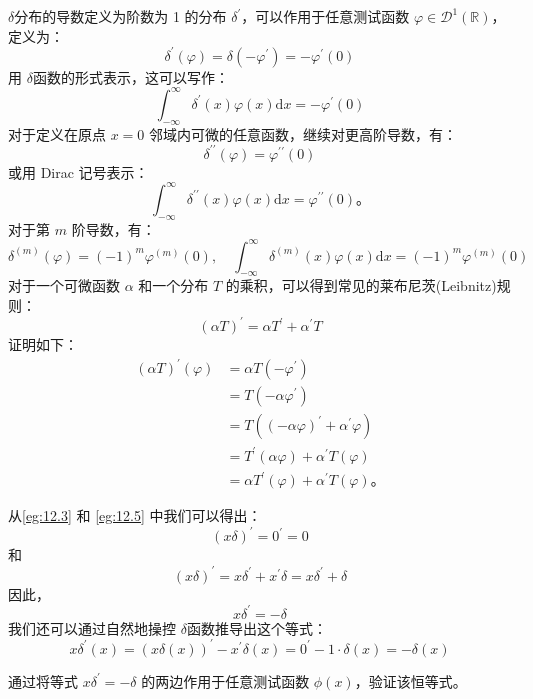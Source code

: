 \begin{eg}\label{eg:12.5} 
  $\delta$分布的导数定义为阶数为 1 的分布
$\delta^{\prime}$，可以作用于任意测试函数
$\varphi \in \mathcal{D}^1(\mathbb{R})$，定义为：
 $$
\delta^{\prime}(\varphi) = \delta\left(-\varphi^{\prime}\right) = -\varphi^{\prime}(0)
$$
用 $\delta$函数的形式表示，这可以写作：
 $$
\int_{-\infty}^\infty \delta^{\prime}(x) \varphi(x) \mathrm{d}x = -\varphi^{\prime}(0)
$$
对于定义在原点 $x=0$ 邻域内可微的任意函数，继续对更高阶导数，有：
 $$
\delta^{\prime\prime}(\varphi) = \varphi^{\prime\prime}(0)
$$
或用 Dirac 记号表示：
 $$
\int_{-\infty}^\infty \delta^{\prime\prime}(x) \varphi(x) \mathrm{d}x = \varphi^{\prime\prime}(0)。
$$
对于第 $m$ 阶导数，有：
 $$
\delta^{(m)}(\varphi) = (-1)^m \varphi^{(m)}(0), \quad \int_{-\infty}^\infty \delta^{(m)}(x) \varphi(x) \mathrm{d}x = (-1)^m \varphi^{(m)}(0)
$$
对于一个可微函数 $\alpha$ 和一个分布 $T$ 的乘积，可以得到常见的莱布尼茨(Leibnitz)规则：
 $$
(\alpha T)^{\prime} = \alpha T^{\prime} + \alpha^{\prime} T
$$
证明如下：
 $$
\begin{aligned}
(\alpha T)^{\prime}(\varphi) & = \alpha T\left(-\varphi^{\prime}\right) \\
& = T\left(-\alpha \varphi^{\prime}\right) \\
& = T\left((-\alpha \varphi)^{\prime} + \alpha^{\prime} \varphi\right) \\
& = T^{\prime}(\alpha \varphi) + \alpha^{\prime} T(\varphi) \\
& = \alpha T^{\prime}(\varphi) + \alpha^{\prime} T(\varphi)。
\end{aligned}
$$
\end{eg}
\begin{eg}\label{eg:12.6} 
  从\ref{eg:12.3} 和 \ref{eg:12.5} 中我们可以得出：
$$
(x \delta)^{\prime} = 0^{\prime} = 0
$$
和
 $$
(x \delta)^{\prime} = x \delta^{\prime} + x^{\prime} \delta = x \delta^{\prime} + \delta
$$
因此，
 $$
x \delta^{\prime} = -\delta
$$
我们还可以通过自然地操控 $\delta$函数推导出这个等式：
 $$
x \delta^{\prime}(x) = (x \delta(x))^{\prime} - x^{\prime} \delta(x) = 0^{\prime} - 1 \cdot \delta(x) = -\delta(x)
$$
\end{eg}

\begin{exercise}
  通过将等式 $x \delta^{\prime} = -\delta$
  的两边作用于任意测试函数 $\phi(x)$，验证该恒等式。
\end{exercise}

